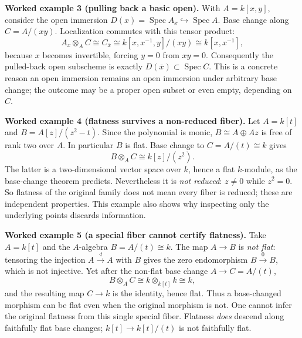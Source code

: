 \par\medskip
\noindent\textbf{Worked example 3 (pulling back a basic open).}
With $A=k[x,y]$, consider the open immersion
$D(x)=\operatorname{Spec}A_x\hookrightarrow\operatorname{Spec}A$.
Base change along $C=A/(xy)$.
Localization commutes with this tensor product:
\[
A_x\otimes_A C\cong C_{\bar x}
\cong k[x,x^{-1},y]/(xy)
\cong k[x,x^{-1}],
\]
because $x$ becomes invertible, forcing $y=0$ from $xy=0$.
Consequently the pulled-back open subscheme is exactly
$D(\bar x)\subset\operatorname{Spec}C$.
This is a concrete reason an open immersion remains an open immersion
under arbitrary base change; the outcome may be a proper open subset
or even empty, depending on $C$.

\par\medskip
\noindent\textbf{Worked example 4 (flatness survives a non-reduced fiber).}
Let $A=k[t]$ and $B=A[z]/(z^2-t)$.  Since the polynomial is monic,
$B\cong A\oplus Az$ is free of rank two over $A$.
In particular $B$ is flat.  Base change to $C=A/(t)\cong k$ gives
\[
B\otimes_A C\cong k[z]/(z^2).
\]
The latter is a two-dimensional vector space over $k$, hence a flat
$k$-module, as the base-change theorem predicts.  Nevertheless it is
\emph{not reduced}: $z\ne0$ while $z^2=0$.
So flatness of the original family does not mean every fiber is
reduced; these are independent properties.  This example also shows
why inspecting only the underlying points discards information.

\par\medskip
\noindent\textbf{Worked example 5 (a special fiber cannot certify flatness).}
Take $A=k[t]$ and the $A$-algebra $B=A/(t)\cong k$.
The map $A\to B$ is \emph{not flat}: tensoring the injection
$A\xrightarrow{\cdot t}A$ with $B$ gives the zero endomorphism
$B\xrightarrow{0}B$, which is not injective.
Yet after the non-flat base change $A\to C=A/(t)$,
\[
B\otimes_A C\cong k\otimes_{k[t]}k\cong k,
\]
and the resulting map $C\to k$ is the identity, hence flat.
Thus a base-changed morphism can be flat even when the original
morphism is not.  One cannot infer the original flatness from this
single special fiber.  Flatness \emph{does} descend along faithfully
flat base changes; $k[t]\to k[t]/(t)$ is not faithfully flat.

